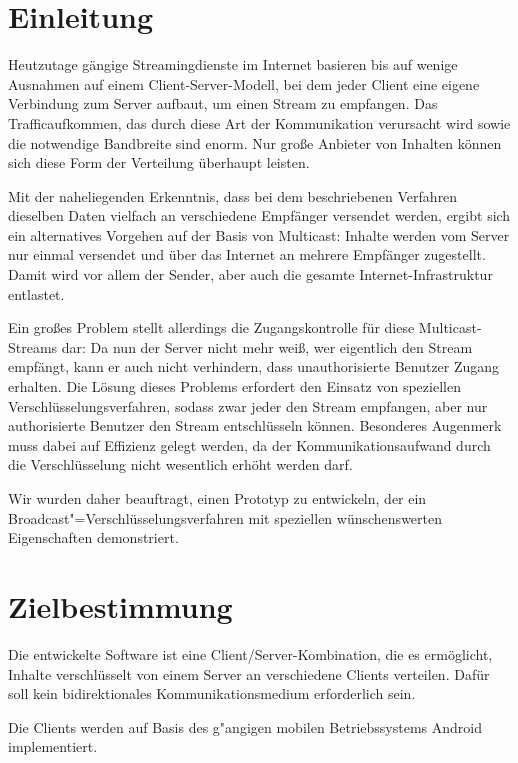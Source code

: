\documentclass[a4paper,10pt]{scrartcl}
\title{\doctitle}
\author{\authorName}
\date{\today}
\begin{document}

\tableofcontents
\clearpage

\section{Einleitung}

Heutzutage gängige Streamingdienste im Internet basieren bis auf wenige Ausnahmen auf
einem Client-Server-Modell, bei dem jeder Client eine eigene Verbindung zum Server
aufbaut, um einen Stream zu empfangen. Das Trafficaufkommen, das durch diese Art der
Kommunikation verursacht wird sowie die notwendige Bandbreite sind enorm. Nur große
Anbieter von Inhalten können sich diese Form der Verteilung überhaupt leisten.

Mit der naheliegenden Erkenntnis, dass bei dem beschriebenen Verfahren dieselben Daten
vielfach an verschiedene Empfänger versendet werden, ergibt sich ein alternatives
Vorgehen auf der Basis von Multicast: Inhalte werden vom Server nur einmal versendet
und über das Internet an mehrere Empfänger zugestellt. Damit wird vor allem der Sender,
aber auch die gesamte Internet-Infrastruktur entlastet.

Ein großes Problem stellt allerdings die Zugangskontrolle für diese Multicast-Streams
dar: Da nun der Server nicht mehr weiß, wer eigentlich den Stream empfängt, kann
er auch nicht verhindern, dass unauthorisierte Benutzer Zugang erhalten. Die Lösung
dieses Problems erfordert den Einsatz von speziellen Verschlüsselungsverfahren,
sodass zwar jeder den Stream empfangen, aber nur authorisierte Benutzer den Stream
entschlüsseln können. Besonderes Augenmerk muss dabei auf Effizienz gelegt werden,
da der Kommunikationsaufwand durch die Verschlüsselung nicht wesentlich erhöht werden
darf.

Wir wurden daher beauftragt, einen Prototyp zu entwickeln, der ein
Broadcast"=Verschlüsselungsverfahren mit speziellen wünschenswerten Eigenschaften
demonstriert.

\section{Zielbestimmung}

Die entwickelte Software ist eine Client/Server-Kombination, die es ermöglicht,
Inhalte verschlüsselt von einem Server an verschiedene Clients verteilen. Dafür
soll kein bidirektionales Kommunikationsmedium erforderlich sein.

Die Clients werden auf Basis des g"angigen mobilen Betriebssystems Android
implementiert.
\end{document}
